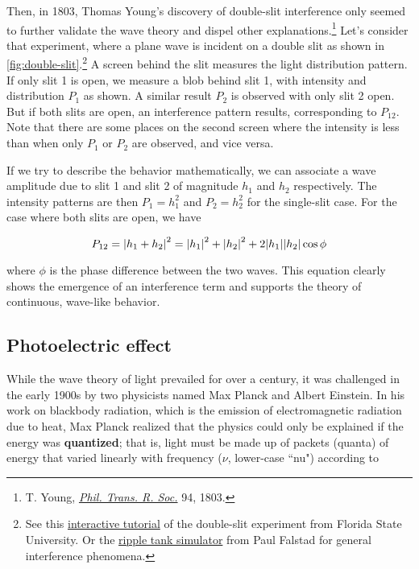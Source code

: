Then, in 1803, Thomas Young's discovery of double-slit interference only seemed to further validate the wave theory and dispel other explanations.\footnote{T. Young, \href{https://royalsocietypublishing.org/doi/abs/10.1098/rstl.1804.0001}{\emph{Phil. Trans. R. Soc.}} 94, 1803.}
Let's consider that experiment, where a plane wave is incident on a double slit as shown in \autoref{fig:double-slit}.\footnote{See this \href{http://micro.magnet.fsu.edu/primer/java/interference/doubleslit/}{interactive tutorial} of the double-slit experiment from Florida State University.
Or the \href{https://falstad.com/ripple/}{ripple tank simulator} from Paul Falstad for general interference phenomena.} 
A screen behind the slit measures the light distribution pattern. 
If only slit 1 is open, we measure a blob behind slit 1, with intensity and distribution $P_1$ as shown. 
A similar result $P_2$ is observed with only slit 2 open. 
But if both slits are open, an interference pattern results, corresponding to $P_{12}$. 
Note that there are some places on the second screen where the intensity is less than when only $P_1$ or $P_2$ are observed, and vice versa.

If we try to describe the behavior mathematically, we can associate a wave amplitude due to slit 1 and slit 2 of magnitude $h_1$ and $h_2$ respectively. 
The intensity patterns are then $P_1 = h_1^2$ and $P_2 = h_2^2$ for the single-slit case. 
For the case where both slits are open, we have

\begin{equation}
	P_{12} = \abs{h_1+h_2}^2 = \abs{h_1}^2 + \abs{h_2}^2 + 2\abs{h_1}\abs{h_2} \cos \phi  \label{eq:interf}
\end{equation}

\noindent where $\phi$ is the phase difference between the two waves. 
This equation clearly shows the emergence of an interference term and supports the theory of continuous, wave-like behavior.


\subsection{Photoelectric effect}

While the wave theory of light prevailed for over a century, it was challenged in the early 1900s by two physicists named Max Planck and Albert Einstein. 
In his work on blackbody radiation, which is the emission of electromagnetic radiation due to heat, Max Planck realized that the physics could only be explained if the energy was \textbf{quantized}; that is, light must be made up of packets (quanta) of energy that varied linearly with frequency ($\nu$, lower-case ``nu") according to

